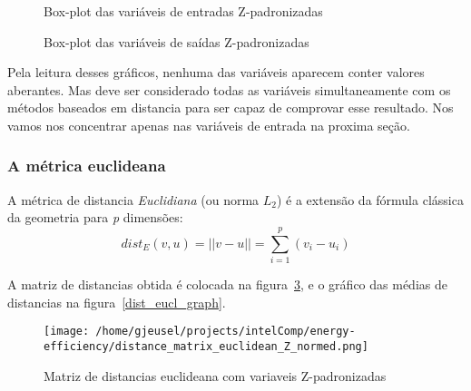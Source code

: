 \documentclass[paper=a4, fontsize=11pt]{article} %
\numberwithin{equation}{section} %
\numberwithin{figure}{section} %
\numberwithin{table}{section} %
\begin{document}
  \begin{figure}[H] %
  \begin{center}
  \end{center}
  \caption{Box-plot das variáveis de entradas Z-padronizadas}
  \label{boxplot_X}
  \end{figure}

  \begin{figure}[H] %
  \begin{center}
  \end{center}
  \caption{Box-plot das variáveis de saídas Z-padronizadas}
  \label{boxplot_Y}
  \end{figure}

Pela leitura desses gráficos, nenhuma das variáveis aparecem conter valores aberantes.
Mas deve ser considerado todas as variáveis simultaneamente com os métodos baseados em distancia para ser capaz de comprovar esse resultado.
Nos vamos nos concentrar apenas nas variáveis de entrada na proxima seção.

\subsubsection{A métrica euclideana}

A métrica de distancia \emph{Euclidiana} (ou norma $L_2$) é a extensão da fórmula clássica da geometria para \emph{p} dimensões:
\begin{equation}
dist_{E}(v,u) = ||v-u|| = \sum_{i=1}^{p} (v_i - u_i)
\end{equation}

A matriz de distancias obtida é colocada na figura~\ref{dist_eucl_matrix}, e o gráfico das médias de distancias na figura~\ref{dist_eucl_graph}.

  \begin{figure}[H] %
  \begin{center}
  \texttt{[image: /home/gjeusel/projects/intelComp/energy-efficiency/distance\_matrix\_euclidean\_Z\_normed.png]}
  \end{center}
  \caption{Matriz de distancias euclideana com variaveis Z-padronizadas}
  \label{dist_eucl_matrix}
  \end{figure}
\end{document}
